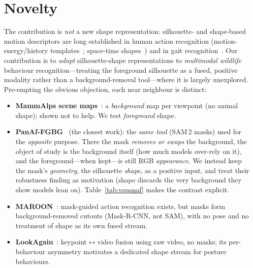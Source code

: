 \documentclass[11pt]{article}
\begin{document}
\section{Novelty}
The contribution is \emph{not} a new shape representation: silhouette- and shape-based motion descriptors are long established in human action recognition (motion-energy/history templates~\cite{bobickdavis}; space-time shapes~\cite{spacetimeshapes}) and in gait recognition~\cite{gaitsurvey}. Our contribution is to \emph{adapt} silhouette-shape representations to \emph{multimodal wildlife} behaviour recognition---treating the foreground silhouette as a fused, positive modality rather than a background-removal tool---where it is largely unexplored. Pre-empting the obvious objection, each near neighbour is distinct:
\begin{itemize}
  \item \textbf{MammAlps scene maps}~\cite{mammalps}: a \emph{background} map per viewpoint (no animal shape); shown not to help. We test \emph{foreground} shape.
  \item \textbf{PanAf-FGBG}~\cite{panaf} (the closest work): the \emph{same tool} (SAM\,2 masks) used for the \emph{opposite} purpose. There the mask \emph{removes or swaps} the background, the object of study is the background itself (how much models over-rely on it), and the foreground---when kept---is still RGB \emph{appearance}. We instead keep the mask's \emph{geometry}, the silhouette \emph{shape}, as a positive input, and treat their robustness finding as motivation (shape discards the very background they show models lean on). Table~\ref{tab:vspanaf} makes the contrast explicit.
  \item \textbf{MAROON}~\cite{maroon}: mask-guided action recognition exists, but masks form background-removed cutouts (Mask-R-CNN, not SAM), with no pose and no treatment of shape as its own fused stream.
  \item \textbf{LookAgain}~\cite{lookagain}: keypoint$\leftrightarrow$video fusion using raw video, no masks; its per-behaviour asymmetry motivates a dedicated shape stream for posture behaviours.
\end{itemize}
\end{document}
